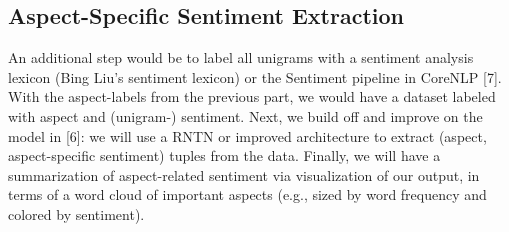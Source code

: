 \documentclass{article} %
\begin{document}
\subsection{Aspect-Specific Sentiment Extraction}

An additional step would be to label all unigrams with a sentiment analysis lexicon (Bing Liu's sentiment lexicon) or the Sentiment pipeline in CoreNLP [7]. With the aspect-labels from the previous part, we would have a dataset labeled with aspect and (unigram-) sentiment. Next, we build off and improve on the model in [6]: we will use a RNTN or improved architecture to extract (aspect, aspect-specific sentiment) tuples from the data. Finally, we will have a summarization of aspect-related sentiment via visualization of our output, in terms of a word cloud of important aspects (e.g., sized by word frequency and colored by sentiment). 





\end{document}
